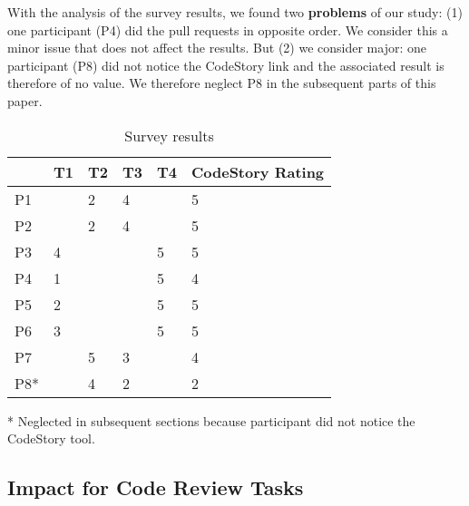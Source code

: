 \documentclass[../manifest.tex]{subfiles}
\begin{document}
With the analysis of the survey results, we found two \textbf{problems} of our study: (1) one participant (P4) did the pull requests in opposite order. We consider this a minor issue that does not affect the results. But (2) we consider major: one participant (P8) did not notice the CodeStory link and the associated result is therefore of no value. We therefore neglect P8 in the subsequent parts of this paper.

\begin{table*}[t]
    \label{tab:survey-results}
    \centering
    \begin{threeparttable}
    \begin{tabular*}{\textwidth}{llllll}
    \hline
    \textbf{} & \textbf{T1} & \textbf{T2} & \textbf{T3} & \textbf{T4} & \textbf{CodeStory Rating} \\
    \hline
    P1 &   & 2 & 4 &   & 5 \\
    P2 &   & 2 & 4 &   & 5 \\
    P3 & 4 &   &   & 5 & 5 \\
    P4 & 1 &   &   & 5 & 4 \\
    P5 & 2 &   &   & 5 & 5 \\
    P6 & 3 &   &   & 5 & 5 \\
    P7 &   & 5 & 3 &   & 4 \\
    P8* &   & 4 & 2 &   & 2 \\
    \hline
    \end{tabular*}
    \begin{tablenotes}\footnotesize
      \item [*] Neglected in subsequent sections because participant did not notice the CodeStory tool.
    \end{tablenotes}
    \end{threeparttable}
    \caption{Survey results}
\end{table*}

\subsection{Impact for Code Review Tasks} \label{eval-impact}
\end{document}
